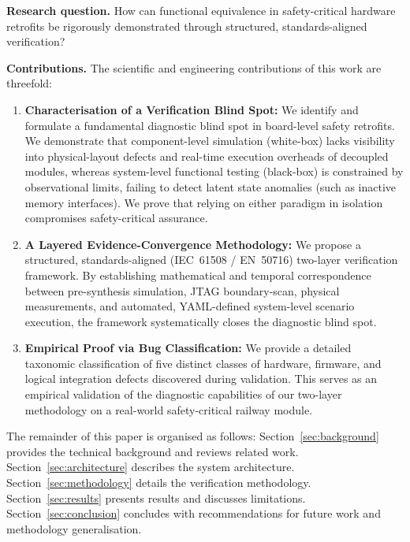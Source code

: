 \documentclass[journal, a4paper]{IEEEtran}
\begin{document}
\textbf{Research question.} How can functional equivalence in safety-critical hardware retrofits be rigorously demonstrated through structured, standards-aligned verification?

\textbf{Contributions.} The scientific and engineering contributions of this work are threefold:
\begin{enumerate}[label=(\alph*), leftmargin=*]
  \item \textbf{Characterisation of a Verification Blind Spot:} We identify and formulate a fundamental diagnostic blind spot in board-level safety retrofits. We demonstrate that component-level simulation (white-box) lacks visibility into physical-layout defects and real-time execution overheads of decoupled modules, whereas system-level functional testing (black-box) is constrained by observational limits, failing to detect latent state anomalies (such as inactive memory interfaces). We prove that relying on either paradigm in isolation compromises safety-critical assurance.
  \item \textbf{A Layered Evidence-Convergence Methodology:} We propose a structured, standards-aligned (IEC~61508 / EN~50716) two-layer verification framework. By establishing mathematical and temporal correspondence between pre-synthesis simulation, JTAG boundary-scan, physical measurements, and automated, YAML-defined system-level scenario execution, the framework systematically closes the diagnostic blind spot.
  \item \textbf{Empirical Proof via Bug Classification:} We provide a detailed taxonomic classification of five distinct classes of hardware, firmware, and logical integration defects discovered during validation. This serves as an empirical validation of the diagnostic capabilities of our two-layer methodology on a real-world safety-critical railway module.
\end{enumerate}

The remainder of this paper is organised as follows: Section~\ref{sec:background} provides the technical background and reviews related work. Section~\ref{sec:architecture} describes the system architecture. Section~\ref{sec:methodology} details the verification methodology. Section~\ref{sec:results} presents results and discusses limitations. Section~\ref{sec:conclusion} concludes with recommendations for future work and methodology generalisation.

\end{document}
